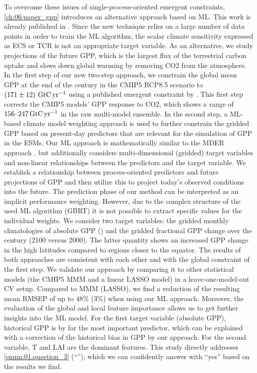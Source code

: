 To overcome these issues of single-process-oriented emergent constraints,
\cref{ch:06:paper_gpp} introduces an alternative approach based on \ac{ML}.
This work is already published in \textcite{Schlund2020}. Since the new
technique relies on a large number of data points in order to train the \ac{ML}
algorithm, the scalar climate sensitivity expressed as \ac{ECS} or \ac{TCR} is
not an appropriate target variable. As an alternative, we study projections of
the future \ac{GPP}, which is the largest flux of the terrestrial carbon uptake
and slows down global warming by removing \ac{CO2} from the atmosphere. In the
first step of our new two-step approach, we constrain the global mean \ac{GPP}
at the end of the  century in the \acs{CMIP}5 \acs{RCP}8.5 scenario to
$\pmrangeunit{171}{12}{\GtCyr{}}$ using a published emergent constraint by
\textcite{Wenzel2016}. This first step corrects the \acs{CMIP}5 models'
\ac{GPP} response to \ac{CO2}, which shows a range of
$\rangeunit{156}{247}{\GtCyr{}}$ in the raw multi-model ensemble. In the second
step, a \ac{ML}-based climate model weighting approach is used to further
constrain the gridded \ac{GPP} based on present-day predictors that are
relevant for the simulation of \ac{GPP} in the \acp{ESM}. Our \ac{ML} approach
is mathematically similar to the \ac{MDER} approach \autocite{Karpechko2013,
  Senftleben2020, Wenzel2016a}, but additionally considers multi-dimensional
(gridded) target variables and non-linear relationships between the predictors
and the target variable. We establish a relationship between process‐oriented
predictors and future projections of \ac{GPP} and then utilize this to project
today's observed conditions into the future. The prediction phase of our method
can be interpreted as an implicit performance weighting. However, due to the
complex structure of the used \ac{ML} algorithm (\ac{GBRT}) it is not possible
to extract specific values for the individual weights. We consider two target
variables: the gridded monthly climatologies of absolute \ac{GPP}
() and the gridded fractional \ac{GPP} change over the
 century (2100 versus 2000). The latter quantity shows an increased
\acs{GPP} change in the high latitudes compared to regions closer to the
equator. The results of both approaches are consistent with each other and with
the global constraint of the first step. We validate our approach by comparing
it to other statistical models (the \acs{CMIP}5 \ac{MMM} and a linear
\ac{LASSO} model) in a leave‐one‐model‐out \ac{CV} setup. Compared to \ac{MMM}
(\ac{LASSO}), we find a reduction of the resulting mean \ac{RMSEP} of up to $48
\unit{\%}$ ($3 \unit{\%}$) when using our \ac{ML} approach. Moreover, the
evaluation of the global and local feature importance allows us to get further
insights into the \ac{ML} model. For the first target variable (absolute
\ac{GPP}), historical \ac{GPP} is by far the most important predictor, which
can be explained with a correction of the historical bias in \ac{GPP} by our
approach. For the second variable, \ac{T} and \ac{LAI} are the dominant
features. This study directly addresses \cref{enum:01:question_3}
(\enquote{\emph{\KeyScienceQuestionThree{}}}), which we can confidently answer
with \enquote{yes} based on the results we find.


